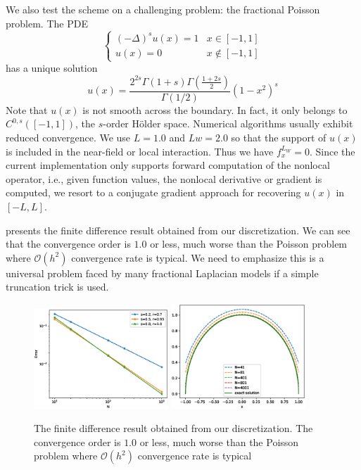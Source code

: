 \documentclass[10pt,a4paper]{article}
\theoremstyle{definition}
\begin{document}
We also test the scheme on a challenging problem: the fractional Poisson problem. The PDE
\begin{equation}
	\begin{cases}
		(-\Delta)^s u(x) = 1 & x\in [-1,1]\\
		u(x) = 0 & x\not\in [-1,1]
	\end{cases}
\end{equation}
has a unique solution
\begin{equation}
	u(x) = \frac{2^{2s}\Gamma(1+s)\Gamma\left( \frac{1+2s}{2} \right) }{\Gamma(1/2)} (1-x^2)^s
\end{equation}
Note that $u(x)$ is not smooth across the boundary. In fact, it only belongs to $C^{0,s}([-1,1])$, the $s$-order H\"older space. Numerical algorithms usually exhibit reduced convergence.  We use $L=1.0$ and $Lw=2.0$ so that the support of $u(x)$ is included in the near-field or local interaction. Thus we have $f_x^{L_W}=0$. Since the current implementation only supports forward computation of the nonlocal operator, i.e., given function values, the nonlocal derivative or gradient is computed, we resort to a conjugate gradient approach for recovering $u(x)$ in $[-L,L]$. 

 presents the finite difference result obtained from our discretization. We can see that the convergence order is $1.0$ or less, much worse than the Poisson problem where $\mathcal{O}(h^2)$ convergence rate is typical. We need to emphasize this is a universal problem faced by many fractional Laplacian models if a simple truncation trick is used. 

\begin{figure}[H] %
\centering
\includegraphics[width=0.45\textwidth,keepaspectratio]{figures/fig6}
\includegraphics[width=0.45\textwidth,keepaspectratio]{figures/fig7}
\caption{The finite difference result obtained from our discretization. The convergence order is $1.0$ or less, much worse than the Poisson problem where $\mathcal{O}(h^2)$ convergence rate is typical}
\label{fig:fig6}
\end{figure}
\end{document}
